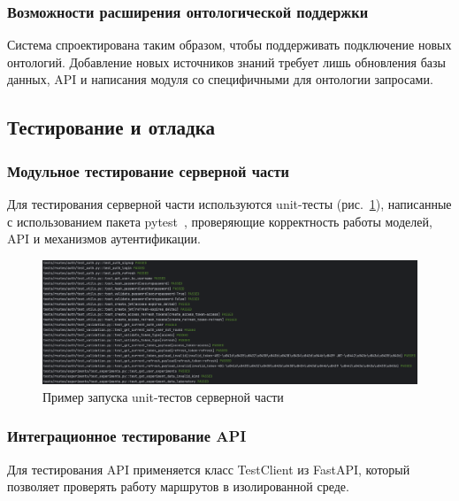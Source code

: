 \subsubsection{Возможности расширения онтологической поддержки}

Система спроектирована таким образом, чтобы поддерживать подключение новых онтологий.
Добавление новых источников знаний требует лишь обновления базы данных, API и написания модуля со специфичными для онтологии запросами.

\subsection{Тестирование и отладка}

\subsubsection{Модульное тестирование серверной части}

Для тестирования серверной части используются unit-тесты (рис.~\ref{pic:backend_unit_tests}), написанные с использованием пакета pytest~\cite{Library:Pytest}, проверяющие корректность работы моделей, API и механизмов аутентификации.

\begin{figure}[H]
\centering
\includegraphics[width=\linewidth]{img/python_unit_tests.png}
\caption{Пример запуска unit-тестов серверной части}
\label{pic:backend_unit_tests}
\end{figure}
\vspace{0.5cm}

\subsubsection{Интеграционное тестирование API}

Для тестирования API применяется класс TestClient из FastAPI, который позволяет проверять работу маршрутов в изолированной среде.


